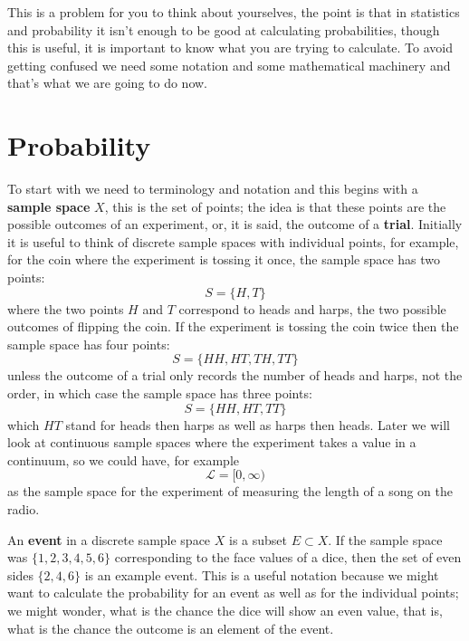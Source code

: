 \documentclass[11pt,a4paper]{scrartcl}
\begin{document}
This is a problem for you to think about yourselves, the point is that
in statistics and probability it isn't enough to be good at
calculating probabilities, though this is useful, it is important to
know what you are trying to calculate. To avoid getting confused we
need some notation and some mathematical machinery and that's what we
are going to do now.

\section*{Probability}

To start with we need to terminology and notation and this begins with
a \textbf{sample space} $X$, this is the set of points; the idea is
that these points are the possible outcomes of an experiment, or, it
is said, the outcome of a \textbf{trial}. Initially it is useful to
think of discrete sample spaces with individual points, for example,
for the coin where the experiment is tossing it once, the sample space
has two points:
\begin{equation}
S=\{H,T\}
\end{equation}
where the two points $H$ and $T$ correspond to heads and harps, the
two possible outcomes of flipping the coin. If the experiment is
tossing the coin twice then the sample space has four points:
\begin{equation}
S=\{HH,HT,TH,TT\}
\end{equation}
unless the outcome of a trial only records the number of heads and
harps, not the order, in which case the sample space has three points:
\begin{equation}
S=\{HH,HT,TT\}
\end{equation}
which $HT$ stand for heads then harps as well as harps then
heads. Later we will look at continuous sample spaces where the
experiment takes a value in a continuum, so we could have, for example
\begin{equation}
\mathcal{L}=[0,\infty)
\end{equation}
as the sample space for the experiment of measuring the length of a
song on the radio.

An \textbf{event} in a discrete sample space $X$ is a subset $E\subset
X$. If the sample space was $\{1,2,3,4,5,6\}$ corresponding to the
face values of a dice, then the set of even sides $\{2,4,6\}$ is an
example event. This is a useful notation because we might want to
calculate the probability for an event as well as for the individual
points; we might wonder, what is the chance the dice will show an even
value, that is, what is the chance the outcome is an element of the
event.
\end{document}

